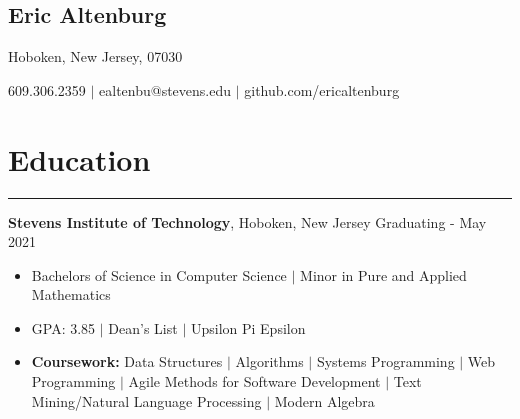 \documentclass[10pt]{article}
\newcommand{\name}[1]{\begin{center}\section*{\huge #1}\end{center}}
\newcommand{\topinfo}[1]{\begin{center}\vspace{-0.15cm}#1\vspace{-0.15cm}\end{center}}
\newcommand{\resumesection}[1]{\vspace{-0.2cm}\section*{#1}\vspace{-0.2cm}\hrule\vspace{0.2cm}}
\begin{document}
\name{Eric Altenburg}
\topinfo{Hoboken, New Jersey, 07030}

\topinfo{609.306.2359 $\vert$ ealtenbu@stevens.edu $\vert$ github.com/ericaltenburg}








\resumesection{Education}
\textbf{Stevens Institute of Technology}, Hoboken, New Jersey \hfill Graduating - May 2021
\begin{itemize}
	\item[] Bachelors of Science in Computer Science $\vert$ Minor in Pure and Applied Mathematics
	\item[] GPA: 3.85 $\vert$ Dean's List $\vert$ Upsilon Pi Epsilon 
	\item[] \textbf{Coursework:} Data Structures $\vert$ Algorithms $\vert$ Systems Programming $\vert$ Web Programming $\vert$ Agile Methods for Software Development $\vert$ Text Mining/Natural Language Processing $\vert$ Modern Algebra
\end{itemize}
\end{document}

